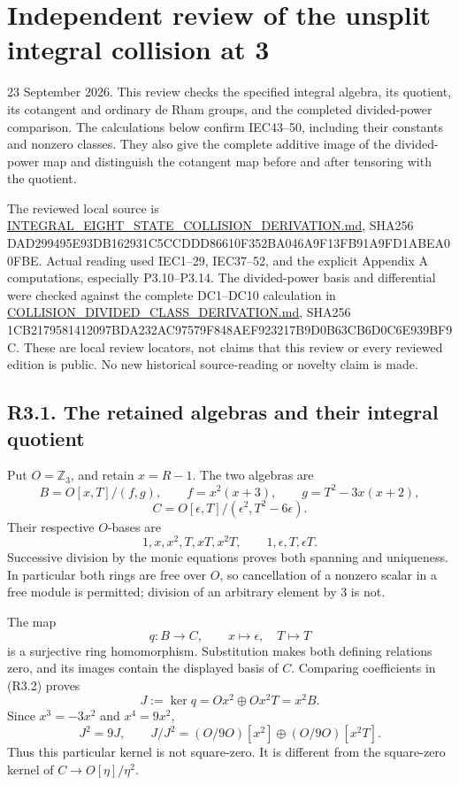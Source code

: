 \documentclass[
]{article}
\author{}
\date{}
\begin{document}
\section{Independent review of the unsplit integral collision at
3}\label{independent-review-of-the-unsplit-integral-collision-at-3}

23 September 2026. This review checks the specified integral algebra,
its quotient, its cotangent and ordinary de Rham groups, and the
completed divided-power comparison. The calculations below confirm
IEC43--50, including their constants and nonzero classes. They also give
the complete additive image of the divided-power map and distinguish the
cotangent map before and after tensoring with the quotient.

The reviewed local source is
\url{INTEGRAL_EIGHT_STATE_COLLISION_DERIVATION.md}, SHA256
DAD299495E93DB162931C5CCDDD86610F352BA046A9F13FB91A9FD1ABEA00FBE. Actual
reading used IEC1--29, IEC37--52, and the explicit Appendix A
computations, especially P3.10--P3.14. The divided-power basis and
differential were checked against the complete DC1--DC10 calculation in
\url{COLLISION_DIVIDED_CLASS_DERIVATION.md}, SHA256
1CB2179581412097BDA232AC97579F848AEF923217B9D0B63CB6D0C6E939BF9C. These
are local review locators, not claims that this review or every reviewed
edition is public. No new historical source-reading or novelty claim is
made.

\subsection{R3.1. The retained algebras and their integral
quotient}\label{r3.1.-the-retained-algebras-and-their-integral-quotient}

Put \(O=\mathbb Z_3\), and retain \(x=R-1\). The two algebras are \[
B=O[x,T]/(f,g),\qquad
f=x^2(x+3),\qquad g=T^2-3x(x+2),
\] \[
C=O[\epsilon,T]/(\epsilon^2,T^2-6\epsilon).
\tag{R3.1}
\] Their respective \(O\)-bases are \[
1,x,x^2,T,xT,x^2T,\qquad
1,\epsilon,T,\epsilon T.
\tag{R3.2}
\] Successive division by the monic equations proves both spanning and
uniqueness. In particular both rings are free over \(O\), so
cancellation of a nonzero scalar in a free module is permitted; division
of an arbitrary element by 3 is not.

The map \[
q:B\longrightarrow C,\qquad x\longmapsto\epsilon,\quad T\longmapsto T
\tag{R3.3}
\] is a surjective ring homomorphism. Substitution makes both defining
relations zero, and its images contain the displayed basis of \(C\).
Comparing coefficients in (R3.2) proves \[
J:=\ker q=Ox^2\oplus Ox^2T=x^2B.
\] Since \(x^3=-3x^2\) and \(x^4=9x^2\), \[
J^2=9J,\qquad
J/J^2=(O/9O)[x^2]\oplus(O/9O)[x^2T].
\tag{R3.4}
\] Thus this particular kernel is not square-zero. It is different from
the square-zero kernel of \(C\to O[\eta]/\eta^2\).
\end{document}
